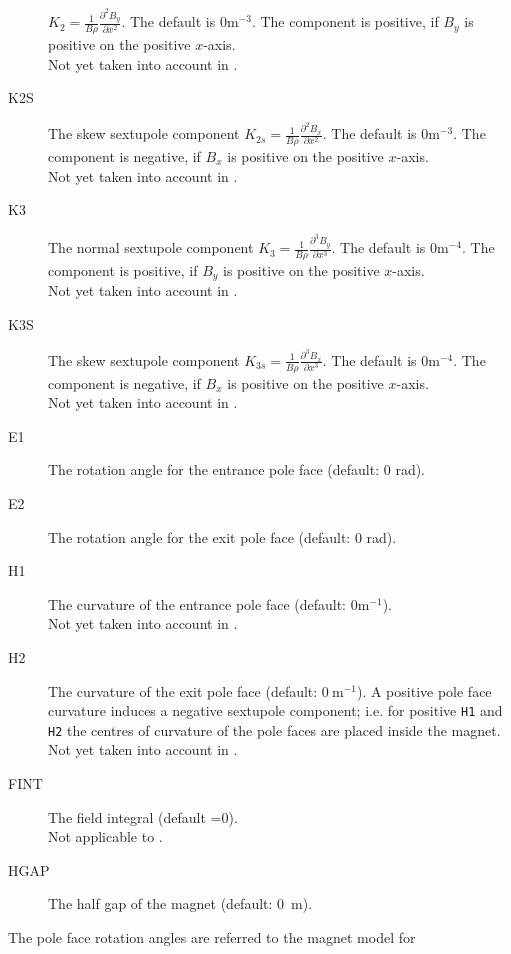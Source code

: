 \begin{description}
  $K_2=\frac{1}{B \rho}\frac{\partial^2 B_y}{\partial x^2}$.
  The default is $0 \mathrm{m}^{-3}$.
  The component is positive, if $B_y$ is positive on the positive $x$-axis.\\
  Not yet taken into account in \opalt.
\item[K2S]
  The skew sextupole component
  $K_{2s}=\frac{1}{B \rho}\frac{\partial^2 B_x}{\partial x^2}$.
  The default is $0 \mathrm{m}^{-3}$.
  The component is negative, if $B_x$ is positive on the positive $x$-axis.\\
  Not yet taken into account in \opalt.
\item[K3]
  The normal sextupole component
  $K_3=\frac{1}{B \rho}\frac{\partial^3 B_y}{\partial x^3}$.
  The default is $0 \mathrm{m}^{-4}$.
  The component is positive, if $B_y$ is positive on the positive $x$-axis.\\
    Not yet taken into account in \opalt.
\item[K3S]
  The skew sextupole component
  $K_{3s}=\frac{1}{B \rho}\frac{\partial^3 B_x}{\partial x^3}$.
  The default is $0 \mathrm{m}^{-4}$.
  The component is negative, if $B_x$ is positive on the positive $x$-axis.\\
  Not yet taken into account in \opalt.
  \item[E1]
  The rotation angle for the entrance pole face
  (default: 0 rad).
\item[E2]
  The rotation angle for the exit pole face
  (default: 0 rad).
\item[H1]
  The curvature of the entrance pole face (default: $0 \mathrm{m}^{-1}$).\\
  Not yet taken into account in \opalt.
  \item[H2]
  The curvature of the exit pole face (default: $0~\mathrm{m}^{-1}$).
  A positive pole face curvature induces a negative sextupole component;
  i.e. for positive \texttt{H1} and \texttt{H2}
  the centres of curvature of the pole faces are placed inside the magnet.\\
  Not yet taken into account in \opalt.
  \item[FINT]
  The field integral (default =0).\\
  Not applicable to \opalt.
  \item[HGAP]
  The half gap of the magnet (default: 0~m).
\end{description}
The pole face rotation angles are referred to the magnet model for
